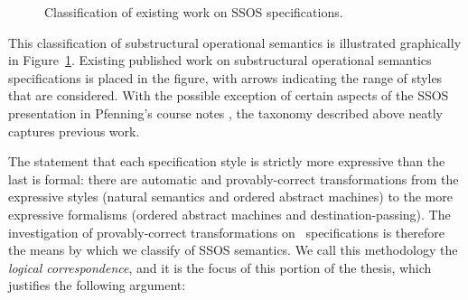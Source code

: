 \begin{figure}
\begin{center}
\end{center}
\caption{Classification of existing work on SSOS specifications.}
\label{fig:class-prevwork}
\end{figure}

This classification of substructural operational semantics is
illustrated graphically in Figure~\ref{fig:class-prevwork}. Existing
published work on substructural operational semantics specifications
is placed in the figure, with arrows indicating the range of styles
that are considered. With the possible exception of certain aspects of
the SSOS presentation in Pfenning's course notes
\cite{pfenning12substructural}, the taxonomy described above neatly
captures previous work. 

The statement that each specification style is strictly more
expressive than the last is formal: there are automatic and
provably-correct transformations from the expressive styles (natural
semantics and ordered abstract machines) to the more expressive
formalisms (ordered abstract machines and destination-passing).  The
investigation of provably-correct transformations on
\sls~specifications is therefore the means by which we classify of
SSOS semantics. We call this methodology the {\it logical
  correspondence}, and it is the focus of this portion of the thesis,
which justifies the following argument:

